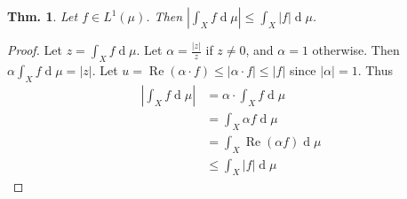 \documentclass[12pt, a4paper]{book}
\DeclareMathOperator{\re}{Re}
\renewcommand{\d}[1]{\ensuremath{\operatorname{d}\!{#1}}} %
\newtheorem{theorem}{Thm.}[section]
\theoremstyle{nonumberplain}
\newtheorem{proof}{Proof}
\begin{document}
\begin{theorem}
    Let $f\in L^1(\mu)$.
    Then $\left\lvert\int_X f\d{\mu}\right\rvert\leq\int_X|f|\d{\mu}$.
\end{theorem}
\begin{proof}
    Let $z=\int_X f\d{\mu}$.
    Let $\alpha=\frac{|z|}{z}$ if $z\neq 0$, and $\alpha=1$ otherwise.
    Then $\alpha\int_X f\d{\mu}=|z|$.
    Let $u=\re(\alpha\cdot f)\leq |\alpha\cdot f|\leq |f|$ since $|\alpha|=1$.
    Thus
    \begin{align*}
        \left\lvert\int_X f\d{\mu}\right\rvert &= \alpha\cdot\int_X f\d{\mu}\\
                                               &=\int_X\alpha f\d{\mu}\\
                                               &= \int_X\re(\alpha f)\d{\mu}\\
                                               &\leq \int_X|f|\d{\mu}
    \end{align*}
\end{proof}
\end{document}
